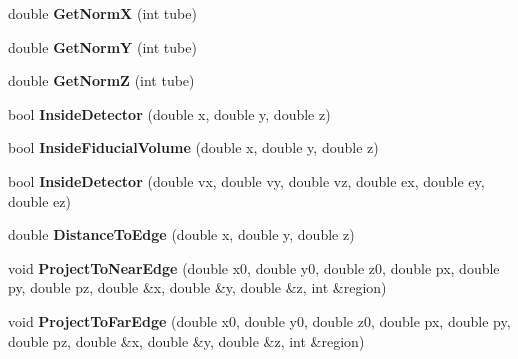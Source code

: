 \begin{DoxyCompactItemize}
\item 
\hypertarget{classANNIEGeometry_ab645d95b1115f411d24baa5dc868b6fb}{
double {\bfseries GetNormX} (int tube)}
\label{classANNIEGeometry_ab645d95b1115f411d24baa5dc868b6fb}

\item 
\hypertarget{classANNIEGeometry_ab674db08c6e04f3f85d82f9135dbe33d}{
double {\bfseries GetNormY} (int tube)}
\label{classANNIEGeometry_ab674db08c6e04f3f85d82f9135dbe33d}

\item 
\hypertarget{classANNIEGeometry_a8dd59a80f126b58e88ab7d3008cb7001}{
double {\bfseries GetNormZ} (int tube)}
\label{classANNIEGeometry_a8dd59a80f126b58e88ab7d3008cb7001}

\item 
\hypertarget{classANNIEGeometry_a8f607acd58c33b95be136fccd285588d}{
bool {\bfseries InsideDetector} (double x, double y, double z)}
\label{classANNIEGeometry_a8f607acd58c33b95be136fccd285588d}

\item 
\hypertarget{classANNIEGeometry_aad46926236afbfb92498aa1642f21180}{
bool {\bfseries InsideFiducialVolume} (double x, double y, double z)}
\label{classANNIEGeometry_aad46926236afbfb92498aa1642f21180}

\item 
\hypertarget{classANNIEGeometry_a971e6acb3ee5883a3aed577831b053cf}{
bool {\bfseries InsideDetector} (double vx, double vy, double vz, double ex, double ey, double ez)}
\label{classANNIEGeometry_a971e6acb3ee5883a3aed577831b053cf}

\item 
\hypertarget{classANNIEGeometry_a9650b8008ba94cc4b53c59f67406db20}{
double {\bfseries DistanceToEdge} (double x, double y, double z)}
\label{classANNIEGeometry_a9650b8008ba94cc4b53c59f67406db20}

\item 
\hypertarget{classANNIEGeometry_a3febbe7fd335e9618a02522d8d55a944}{
void {\bfseries ProjectToNearEdge} (double x0, double y0, double z0, double px, double py, double pz, double \&x, double \&y, double \&z, int \&region)}
\label{classANNIEGeometry_a3febbe7fd335e9618a02522d8d55a944}

\item 
\hypertarget{classANNIEGeometry_ac3c306909b0de82f5ddcc58de6345b16}{
void {\bfseries ProjectToFarEdge} (double x0, double y0, double z0, double px, double py, double pz, double \&x, double \&y, double \&z, int \&region)}
\label{classANNIEGeometry_ac3c306909b0de82f5ddcc58de6345b16}


\end{DoxyCompactItemize}
